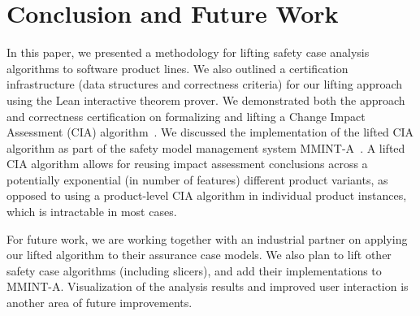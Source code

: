 \vspace{-0.1in}
\section{Conclusion and Future Work}
\label{sec:conclusion}
\vspace{-0.1in}
 In this paper, we presented a methodology for lifting safety case analysis algorithms to software product lines. We also outlined a certification infrastructure (data structures and correctness criteria) for our lifting approach using the Lean interactive theorem prover. We demonstrated both the approach and correctness certification on formalizing and lifting a Change Impact Assessment (CIA) algorithm~\cite{Kokaly:2017}. We discussed the implementation of the lifted CIA algorithm as part of the safety model management system MMINT-A~\cite{Fung:2018}. 
 A lifted CIA algorithm allows for reusing impact assessment conclusions across a potentially exponential  (in number of features) different product variants, as opposed to using a product-level CIA algorithm in individual product instances, which is intractable in most cases.
 
 For future work, we are working together with an industrial partner on applying our lifted algorithm to their assurance case models. We also plan to lift other safety case algorithms (including slicers), and add their implementations to MMINT-A. Visualization of the analysis results and improved user interaction is another area of future improvements.
 \vspace{-0.1in}